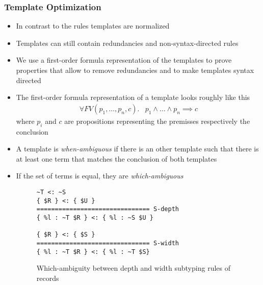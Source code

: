 \documentclass{beamer}
\begin{document}
\begin{frame}
  \frametitle{Template Optimization}
  \begin{itemize}
  \item In contrast to the rules templates are normalized
  \item Templates can still contain redundancies and
    non-syntax-directed rules
  \item We use a first-order formula representation of the templates
    to prove properties that allow to remove redundancies and to make
    templates syntax directed
  \item The first-order formula representation of a template looks
    roughly like this
    \begin{align}
      \forall FV(p_1,\dots, p_n, c) .& p_1 \land \dots \land p_n
      \implies c
    \end{align}
    where $p_i$ and $c$ are propositions representing the premisses
    respectively the conclusion
  \end{itemize}

\framebreak{}

  \begin{itemize}
  \item A template is \textit{when-ambiguous} if there is an other
    template such that there is at least one term that matches the
    conclusion of both templates
  \item If the set of terms is equal, they are \textit{which-ambiguous}
\begin{figure}
\begin{lstlisting}[language=sltc]
~T <: ~S
{ $R } <: { $U }
=============================== S-depth
{ %l : ~T $R } <: { %l : ~S $U }

{ $R } <: { $S }
=============================== S-width
{ %l : ~T $R } <: { %l : ~T $S}
\end{lstlisting}
\caption{Which-ambiguity between depth and width subtyping rules of records}
\end{figure}
\end{itemize}

\framebreak{}


\end{frame}
\end{document}
